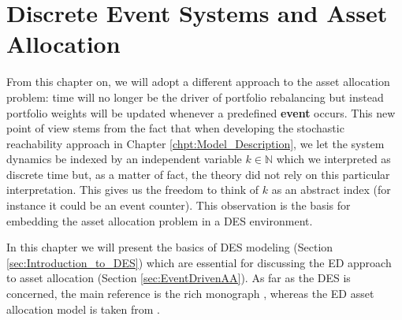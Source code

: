 \chapter{Discrete Event Systems and Asset Allocation}
From this chapter on, we will adopt a different approach to the asset allocation problem: time will no longer be the driver of portfolio rebalancing but instead portfolio weights  will be updated whenever a predefined \textbf{event} occurs. This new point of view stems from the fact that when developing the stochastic reachability approach in Chapter \ref{chpt:Model_Description}, we let the system dynamics be indexed by an independent variable $k \in \mathbb{N}$ which we interpreted as discrete time but, as a matter of fact, the theory did not rely on this particular interpretation. This gives us the freedom to think of $k$ as an abstract index (for instance it could be an event counter). This observation is the basis for embedding the asset allocation problem in a \gls{DES} environment. 

In this chapter we will present the basics of \gls{DES} modeling (Section \ref{sec:Introduction_to_DES}) which are essential for discussing the \gls{ED} approach to asset allocation (Section \ref{sec:EventDrivenAA}). As far as the \gls{DES} is concerned, the main reference is the rich monograph \cite{cassandras2009}, whereas the \gls{ED} asset allocation model is taken from \cite{specchio2011}.

